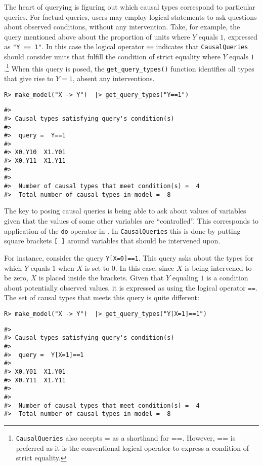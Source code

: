 \documentclass[
  11pt,
  article]{jss}
\begin{document}
The heart of querying is figuring out which causal types correspond to
particular queries. For factual queries, users may employ logical
statements to ask questions about observed conditions, without any
intervention. Take, for example, the query mentioned above about the
proportion of units where \(Y\) equals \(1\), expressed as
\texttt{"Y\ ==\ 1"}. In this case the logical operator \texttt{==}
indicates that \texttt{CausalQueries} should consider units that fulfill
the condition of strict equality where \(Y\) equals \(1\).\footnote{\texttt{CausalQueries}
  also accepts = as a shorthand for ==. However, == is preferred as it
  is the conventional logical operator to express a condition of strict
  equality.} When this query is posed, the \texttt{get\_query\_types()}
function identifies all types that give rise to \(Y=1\), absent any
interventions.

\begin{verbatim}
R> make_model("X -> Y")  |> get_query_types("Y==1")
\end{verbatim}

\begin{verbatim}
#> 
#> Causal types satisfying query's condition(s)  
#> 
#>  query =  Y==1 
#> 
#> X0.Y10  X1.Y01
#> X0.Y11  X1.Y11
#> 
#> 
#>  Number of causal types that meet condition(s) =  4
#>  Total number of causal types in model =  8
\end{verbatim}

The key to posing causal queries is being able to ask about values of
variables given that the values of some other variables are
``controlled''. This corresponds to application of the \texttt{do}
operator in \citet{pearl_causality_2009}. In \texttt{CausalQueries} this
is done by putting square brackets \texttt{{[}\ {]}} around variables
that should be intervened upon.

For instance, consider the query \texttt{Y{[}X=0{]}==1}. This query asks
about the types for which \(Y\) equals \(1\) when \(X\) is set to \(0\).
In this case, since \(X\) is being intervened to be zero, \(X\) is
placed inside the brackets. Given that \(Y\) equaling \(1\) is a
condition about potentially observed values, it is expressed as using
the logical operator \texttt{==}. The set of causal types that meets
this query is quite different:

\begin{verbatim}
R> make_model("X -> Y")  |> get_query_types("Y[X=1]==1")
\end{verbatim}

\begin{verbatim}
#> 
#> Causal types satisfying query's condition(s)  
#> 
#>  query =  Y[X=1]==1 
#> 
#> X0.Y01  X1.Y01
#> X0.Y11  X1.Y11
#> 
#> 
#>  Number of causal types that meet condition(s) =  4
#>  Total number of causal types in model =  8
\end{verbatim}
\end{document}
